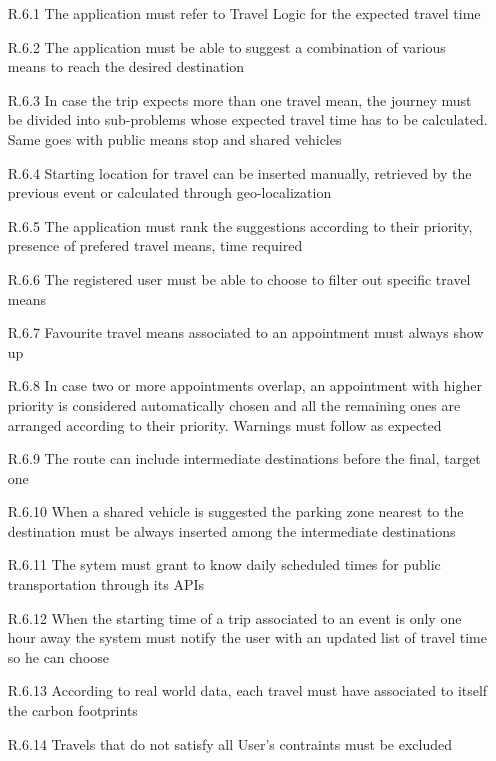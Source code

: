 \begin{itemize}
                  \begin{itemize}
                        \item [R.6.1] The application must refer to Travel Logic for the expected travel time 
                        \item [R.6.2] The application must be able to suggest a combination of various means to reach the desired destination
                        \item [R.6.3] In case the trip expects more than one travel mean, the journey must be divided into sub-problems whose expected travel time has to be calculated. Same goes with public means stop and shared vehicles 
                        \item [R.6.4] Starting location for travel can be inserted manually, retrieved by the previous event or calculated through geo-localization
                        \item [R.6.5] The application must rank the suggestions according to their priority, presence of prefered travel means, time required
                        \item [R.6.6] The registered user must be able to choose to filter out specific travel means
                        \item [R.6.7] Favourite travel means associated to an appointment must always show up
                        \item [R.6.8] In case two or more appointments overlap, an appointment with higher priority is considered automatically chosen and all the remaining ones are arranged according to their priority. Warnings must follow as expected
                        \item [R.6.9] The route can include intermediate destinations before the final, target one 
                        \item [R.6.10] When a shared vehicle is suggested the parking zone nearest to the destination must be always inserted among the intermediate destinations 
                        \item [R.6.11] The sytem must grant to know daily scheduled times for public transportation through its APIs
                        \item [R.6.12] When the starting time of a trip associated to an event is only one hour away the system must notify the user with an updated list of travel time so he can choose
                        \item [R.6.13] According to real world data, each travel must have associated to itself the carbon footprints
                       	\item [R.6.14] Travels that do not satisfy all User's contraints must be excluded
                        

\end{itemize}
\end{itemize}
